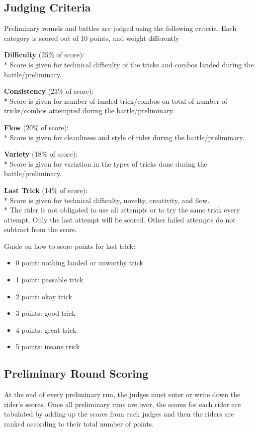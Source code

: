 \subsection{Judging Criteria}

Preliminary rounds and battles are judged using the following criteria.
Each category is scored out of 10 points, and weight differently

\textbf{Difficulty} (25\% of score): \\*
Score is given for technical difficulty of the tricks and combos landed during the battle/preliminary.

\textbf{Consistency} (23\% of score): \\*
Score is given for number of landed trick/combos on total of number of tricks/combos attempted during the battle/preliminary.

\textbf{Flow} (20\% of score): \\*
Score is given for cleanliness and style of rider during the battle/preliminary.

\textbf{Variety} (18\% of score): \\*
Score is given for variation in the types of tricks done during the battle/preliminary.

\textbf{Last Trick} (14\% of score): \\*
Score is given for technical difficulty, novelty, creativity, and flow.\\*
The rider is not obligated to use all attempts or to try the same trick every attempt.
Only the last attempt will be scored.
Other failed attempts do not subtract from the score.

Guide on how to score points for last trick:
\begin{itemize}
\item 0 point: nothing landed or unworthy trick
\item 1 point: passable trick
\item 2 point: okay trick
\item 3 points: good trick
\item 4 points: great trick
\item 5 points: insane trick
\end{itemize}

\subsection{Preliminary Round Scoring}
At the end of every preliminary run, the judges must enter or write down the rider's scores.
Once all preliminary runs are over, the scores for each rider are tabulated by adding up the scores from each judges and then the riders are ranked according to their total number of points.

